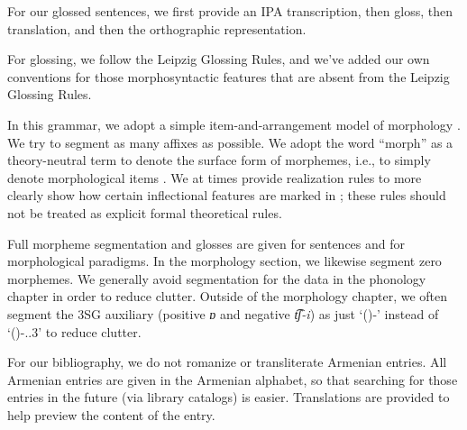 For our glossed sentences, we first provide an IPA transcription, then gloss, then translation, and then the orthographic representation.


For glossing, we follow the   Leipzig Glossing Rules, and we've added our own conventions for those morphosyntactic features that are absent from the Leipzig Glossing Rules. 

In this grammar,  we adopt a simple item-and-arrangement model of morphology \citep{Hockett-1942-SystemDescriptivePhono}. We try to segment  as many affixes as possible. We adopt the word “morph” as a theory-neutral term to denote the surface form of morphemes, i.e., to simply denote  morphological items \citep{Haspelmath-2020-MorphMinimalLinguisticForm}. We at times provide realization rules to more clearly show how certain inflectional features are marked in {\iaIA}; these rules should not be treated as explicit formal theoretical rules.  

Full morpheme segmentation and glosses are given for sentences and for morphological paradigms.  In the morphology section, we likewise segment zero morphemes. We generally avoid segmentation for the data in the phonology chapter in order to reduce clutter. Outside of the morphology chapter, we often segment the    3SG auxiliary (positive \textit{ɒ} and negative \textit{t͡ʃ-i}) as just   `({\neggloss})-{\auxgloss}' instead of  `({\neggloss})-{\auxgloss}.{\prs}.3{\sg}' to reduce clutter. 

For our bibliography, we do not romanize or transliterate Armenian entries. All Armenian entries are given in the Armenian alphabet, so that searching for those entries in the future (via library catalogs) is easier. Translations are provided to help preview the content of the entry. 
